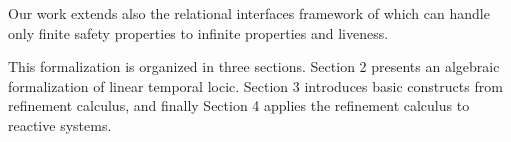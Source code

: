 \documentclass[11pt,a4paper]{article}
\begin{document}
Our work extends also the relational interfaces framework
of \cite{tripakis:2011} which can handle only finite safety 
properties to infinite properties and liveness.

This formalization is organized in three sections. 
Section 2 presents an algebraic formalization of 
linear temporal locic. Section 3 introduces basic
constructs from refinement calculus, and finally 
Section 4 applies the refinement calculus to reactive
systems. 







\end{document}
